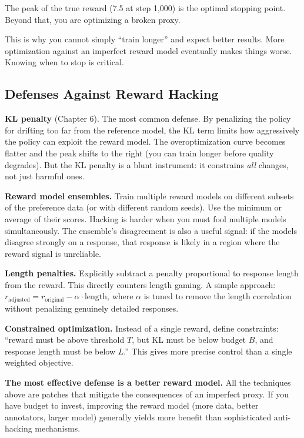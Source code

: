 \begin{chapterenv}
\begin{infobox}
The peak of the true reward (7.5 at step 1,000) is the optimal stopping point. Beyond that, you are optimizing a broken proxy.
\end{infobox}

This is why you cannot simply ``train longer'' and expect better results. More optimization against an imperfect reward model eventually makes things worse. Knowing when to stop is critical.

\subsection{Defenses Against Reward Hacking}

\textbf{KL penalty} (Chapter 6). The most common defense. By penalizing the policy for drifting too far from the reference model, the KL term limits how aggressively the policy can exploit the reward model. The overoptimization curve becomes flatter and the peak shifts to the right (you can train longer before quality degrades). But the KL penalty is a blunt instrument: it constrains \textit{all} changes, not just harmful ones.

\textbf{Reward model ensembles.} Train multiple reward models on different subsets of the preference data (or with different random seeds). Use the minimum or average of their scores. Hacking is harder when you must fool multiple models simultaneously. The ensemble's disagreement is also a useful signal: if the models disagree strongly on a response, that response is likely in a region where the reward signal is unreliable.

\textbf{Length penalties.} Explicitly subtract a penalty proportional to response length from the reward. This directly counters length gaming. A simple approach: $r_{\text{adjusted}} = r_{\text{original}} - \alpha \cdot \text{length}$, where $\alpha$ is tuned to remove the length correlation without penalizing genuinely detailed responses.

\textbf{Constrained optimization.} Instead of a single reward, define constraints: ``reward must be above threshold $T$, but KL must be below budget $B$, and response length must be below $L$.'' This gives more precise control than a single weighted objective.

\begin{tipbox}
\textbf{The most effective defense is a better reward model.} All the techniques above are patches that mitigate the consequences of an imperfect proxy. If you have budget to invest, improving the reward model (more data, better annotators, larger model) generally yields more benefit than sophisticated anti-hacking mechanisms.
\end{tipbox}


\end{chapterenv}
